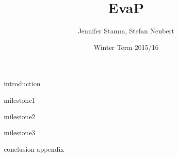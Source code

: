 \documentclass[12pt,a4paper]{scrartcl}
\title{EvaP}
\author{Jennifer Stamm, Stefan Neubert}
\date{Winter Term 2015/16}
\begin{document}
	\maketitle
	\setcounter{section}{-1}
	\tableofcontents
	
	\clearpage
	
	{introduction}

	{milestone1}

	{milestone2}

	{milestone3}
	
	{conclusion}
	\clearpage
	{appendix}
\end{document}
